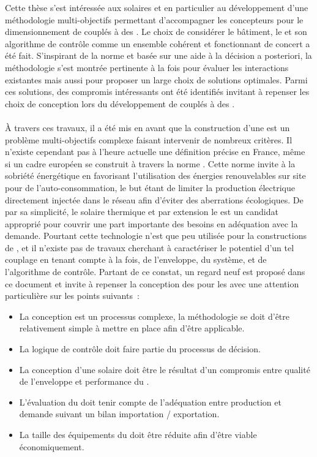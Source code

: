 

Cette thèse s’est intéressée aux  solaires et en particulier au développement
d’une méthodologie  multi-objectifs permettant d’accompagner les concepteurs pour le
dimensionnement de  couplés à des . Le choix de
considérer le bâtiment, le  et son algorithme de contrôle comme un ensemble
cohérent et fonctionnant de concert a été fait. S’inspirant de la norme  et
basée sur une aide à la décision a posteriori, la méthodologie s’est montrée pertinente
à la fois pour évaluer les interactions existantes mais aussi pour proposer un large choix
de solutions optimales. Parmi ces solutions, des compromis intéressants ont été
identifiés invitant à repenser les choix de conception lors du développement de 
couplés à des .


\paragraph{} %
À travers ces travaux, il a été mis en avant que la construction d’une  est un
problème multi-objectifs complexe faisant intervenir de nombreux critères. Il n’existe
cependant pas à l’heure actuelle une définition précise en France, même si un cadre
européen se construit à travers la norme . Cette norme invite à
la sobriété énergétique en favorisant l’utilisation des énergies renouvelables sur site
pour de l’auto-consommation, le but étant de limiter la production électrique directement
injectée dans le réseau afin d’éviter des aberrations écologiques.
De par sa simplicité, le solaire thermique et par extension le  est un
candidat approprié pour couvrir une part importante des besoins en adéquation avec la
demande. Pourtant cette technologie n’est que peu utilisée pour la constructions de
, et il n’existe pas de travaux cherchant à caractériser le potentiel d’un tel
couplage en tenant compte à la fois, de l’enveloppe, du système, et de l’algorithme de
contrôle. Partant de ce constat, un regard neuf est proposé dans ce document et invite à
repenser la conception des  pour les  avec une attention
particulière sur les points suivants~:
\begin{itemize}
    \item La conception est un processus complexe, la méthodologie se doit d’être
          relativement simple à mettre en place afin d’être applicable.
    \item La logique de contrôle doit faire partie du processus de décision.
    \item La conception d’une  solaire doit être le résultat d’un compromis
          entre qualité de l’enveloppe et performance du .
    \item L’évaluation du  doit tenir compte de l’adéquation entre production
          et demande suivant un bilan importation / exportation.
    \item La taille des équipements du  doit être réduite afin d’être viable
          économiquement.
\end{itemize}

